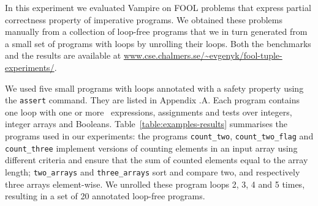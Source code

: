 

In this experiment we evaluated Vampire on FOOL problems that express partial correctness property of imperative programs. We obtained these problems manually from a collection of loop-free programs that we in turn generated from a small set of programs with loops by unrolling their loops. Both the benchmarks and the results are available at \url{www.cse.chalmers.se/~evgenyk/fool-tuple-experiments/}.


%
We used five small programs with loops annotated with a safety property using the {\tt assert} command. They are listed in Appendix \thechapter.A. Each program contains one loop with one or more
\ITE\ expressions, assignments and tests over integers,
integer arrays and Booleans. Table~\ref{table:examples-results}
summarises the programs used in our experiments: the programs
\verb'count_two',  \verb'count_two_flag' and \verb'count_three'
implement versions of counting elements in an input array using
different criteria and ensure that the sum of counted elements equal
to the array length; \verb'two_arrays' and \verb'three_arrays' sort
and compare 
two, and respectively three arrays element-wise. 
We unrolled these program loops 2, 3, 4 and 5
times, resulting in a set of 20 annotated loop-free programs.

